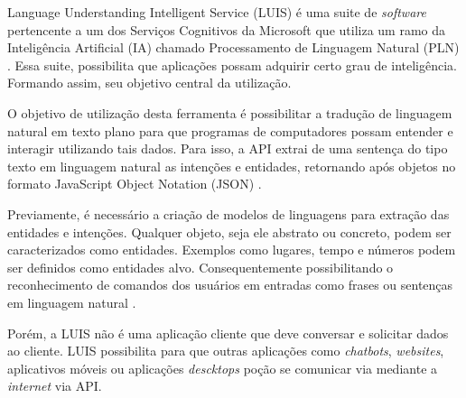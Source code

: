 Language Understanding Intelligent Service (LUIS) é uma suite de \textit{software} pertencente a um dos Serviços Cognitivos da Microsoft que utiliza um ramo da Inteligência Artificial (IA) chamado Processamento de Linguagem Natural (PLN) \cite{Mayo:2017}. Essa suite, possibilita que aplicações possam adquirir certo grau de inteligência. Formando assim, seu objetivo central da utilização.

O objetivo de utilização desta ferramenta é possibilitar a tradução de linguagem natural em texto plano para que programas de computadores possam entender e interagir utilizando tais dados. Para isso, a API extrai de uma sentença do tipo texto em linguagem natural as intenções e entidades, retornando após objetos no formato JavaScript Object Notation (JSON) \cite{Mayo:2017}.

Previamente, é necessário a criação de modelos de linguagens para extração das entidades e intenções. Qualquer objeto, seja ele abstrato ou concreto, podem ser caracterizados como entidades. Exemplos como lugares, tempo e números podem ser definidos como entidades alvo. Consequentemente possibilitando o reconhecimento de comandos dos usuários em entradas como frases ou sentenças em linguagem natural \cite{Larsen:2017}.

Porém, a LUIS não é uma aplicação cliente que deve conversar e solicitar dados ao cliente. LUIS possibilita para que outras aplicações como \textit{chatbots}, \textit{websites}, aplicativos móveis ou aplicações \textit{descktops} poção se comunicar via mediante a \textit{internet} via API.
